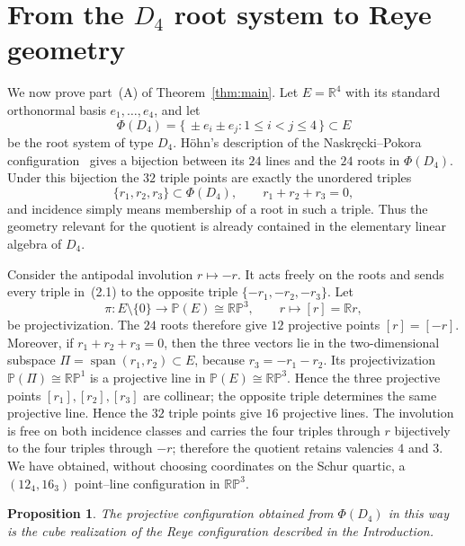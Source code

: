 \documentclass[10pt]{article}
\newtheorem{proposition}{Proposition}[section]
\newcommand{\PP}{\mathbb P}
\newcommand{\R}{\mathbb R}
\begin{document}
\section{From the $D_4$ root system to Reye geometry}

We now prove part~\textup{(A)} of Theorem~\ref{thm:main}.  Let $E=\R^4$ with its standard orthonormal basis $e_1,\ldots,e_4$, and let
\[
\Phi(D_4)=\{\,\pm e_i\pm e_j:1\leq i<j\leq4\,\}\subset E
\]
be the root system of type $D_4$.  H\"ohn's description of the Naskr\k{e}cki--Pokora configuration~\cite{H26} gives a bijection between its $24$ lines and the $24$ roots in $\Phi(D_4)$.  Under this bijection the $32$ triple points are exactly the unordered triples
\[
\{r_1,r_2,r_3\}\subset\Phi(D_4),\qquad r_1+r_2+r_3=0,
\tag{2.1}
\]
and incidence simply means membership of a root in such a triple.  Thus the geometry relevant for the quotient is already contained in the elementary linear algebra of $D_4$.

Consider the antipodal involution $r\mapsto-r$.  It acts freely on the roots and sends every triple in~(2.1) to the opposite triple $\{-r_1,-r_2,-r_3\}$.  Let
\[
\pi:E\setminus\{0\}\longrightarrow\PP(E)\cong\mathbb{RP}^3,
\qquad r\longmapsto[r]=\R r,
\]
be projectivization.  The $24$ roots therefore give $12$ projective points $[r]=[-r]$.  Moreover, if $r_1+r_2+r_3=0$, then the three vectors lie in the two-dimensional subspace $\Pi=\operatorname{span}(r_1,r_2)\subset E$, because $r_3=-r_1-r_2$.  Its projectivization $\PP(\Pi)\cong\mathbb{RP}^1$ is a projective line in $\PP(E)\cong\mathbb{RP}^3$.  Hence the three projective points $[r_1],[r_2],[r_3]$ are collinear; the opposite triple determines the same projective line.  Hence the $32$ triple points give $16$ projective lines.  The involution is free on both incidence classes and carries the four triples through $r$ bijectively to the four triples through $-r$; therefore the quotient retains valencies $4$ and $3$.  We have obtained, without choosing coordinates on the Schur quartic, a $(12_4,16_3)$ point--line configuration in $\mathbb{RP}^3$.

\begin{proposition}\label{prop:d4-reye}
The projective configuration obtained from $\Phi(D_4)$ in this way is the cube realization of the Reye configuration described in the Introduction.
\end{proposition}
\end{document}
